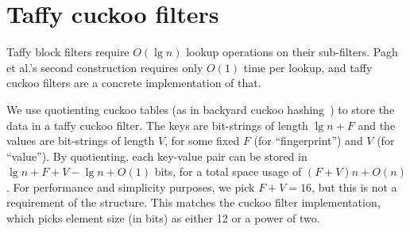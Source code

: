 \documentclass[sigconf, nonacm]{acmart}
\newcommand{\etal}{et al.}
\begin{document}
\section{Taffy cuckoo filters}
\label{tcf}



Taffy block filters require $O(\lg n)$ lookup operations on their sub-filters.
Pagh \etal{}'s second construction requires only $O(1)$ time per lookup, and taffy cuckoo filters are a concrete implementation of that.

We use quotienting cuckoo tables (as in backyard cuckoo hashing~\cite{backyard}) to store the data in a taffy cuckoo filter.
The keys are bit-strings of length $\lg n + F$ and the values are bit-strings of length $V$, for some fixed $F$ (for ``fingerprint'') and $V$ (for ``value'').
By quotienting, each key-value pair can be stored in $\lg n + F + V - \lg n + O(1)$ bits, for a total space usage of $(F+V)n + O(n)$.
For performance and simplicity purposes, we pick $F + V = 16$, but this is not a requirement of the structure.
This matches the cuckoo filter implementation, which picks element size (in bits) as either 12 or a power of two.
\end{document}

